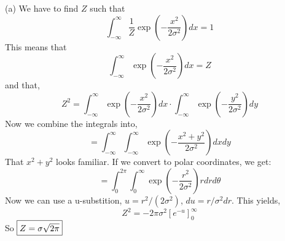 \documentclass[12pt,letterpaper,fleqn]{hmcpset}
\begin{document}
\begin{solution}
	(a) We have to find $Z$ such that
	$$\int_{-\infty}^{\infty}\frac{1}{Z}\exp\left(-\frac{x^2}{2\sigma^2}\right)dx = 1$$
	This means that
	$$\int_{-\infty}^{\infty}\exp\left(-\frac{x^2}{2\sigma^2}\right)dx = Z$$
	and that, 
	$$ Z^2 = \int_{-\infty}^{\infty}\exp\left(-\frac{x^2}{2\sigma^2}\right)dx \cdot \int_{-\infty}^{\infty}\exp\left(-\frac{y^2}{2\sigma^2}\right)dy $$
	Now we combine the integrals into,
	$$ = \int_{-\infty}^{\infty}\int_{-\infty}^{\infty}\exp\left(-\frac{x^2+y^2}{2\sigma^2}\right)dxdy $$
	That $x^2 + y^2$ looks familiar. If we convert to polar coordinates, we get:
	$$ = \int_{0}^{2\pi}\int_{0}^{\infty}\exp\left(-\frac{r^2}{2\sigma^2}\right)rdrd\theta $$
	Now we can use a u-substition, $u=r^2/(2\sigma^2)$, $du = r/\sigma^2dr$. This yields,
	$$Z^2 = -2\pi \sigma^2 \left[ e^{-u} \right]_0^\infty$$
	So $\fbox{$Z=\sigma\sqrt{2\pi}$}$\\


\end{solution}
\end{document}
